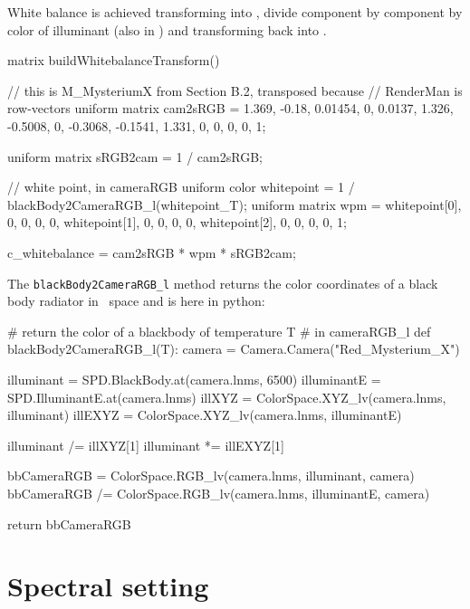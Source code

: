 White balance is achieved transforming into \camRGBl, divide component by
component by color of illuminant (also in \camRGBl) and transforming back into
\sRGBl.

\begin{rslcode}
matrix buildWhitebalanceTransform()
{
    // this is M\_MysteriumX from Section B.2, transposed because
    // RenderMan is row-vectors
    uniform matrix cam2sRGB = {  1.369,  -0.18,   0.01454, 0,
                                 0.0137,  1.326, -0.5008,  0,
                                -0.3068, -0.1541, 1.331,   0,
                                 0,       0,      0,       1};

    uniform matrix sRGB2cam = 1 / cam2sRGB;

    // white point, in cameraRGB
    uniform color whitepoint = 1 / blackBody2CameraRGB_l(whitepoint_T);
    uniform matrix wpm = {  whitepoint[0], 0,  0,  0,
                            0,  whitepoint[1], 0,  0,
                            0,  0,  whitepoint[2], 0,
                            0,  0,  0,             1};

    c_whitebalance = cam2sRGB * wpm * sRGB2cam;
}
\end{rslcode}

The \Verb|blackBody2CameraRGB_l| method returns the color coordinates of a black body
radiator in \camRGBl\ space and is here in python:

\begin{pythoncode}
# return the color of a blackbody of temperature T
# in cameraRGB\_l
def blackBody2CameraRGB_l(T):
    camera = Camera.Camera("Red_Mysterium_X")

    illuminant = SPD.BlackBody.at(camera.lnms, 6500)
    illuminantE = SPD.IlluminantE.at(camera.lnms)
    illXYZ = ColorSpace.XYZ_lv(camera.lnms, illuminant)
    illEXYZ = ColorSpace.XYZ_lv(camera.lnms, illuminantE)

    illuminant /= illXYZ[1]
    illuminant *= illEXYZ[1]

    bbCameraRGB = ColorSpace.RGB_lv(camera.lnms, illuminant, camera)
    bbCameraRGB /=  ColorSpace.RGB_lv(camera.lnms, illuminantE, camera)

    return bbCameraRGB
\end{pythoncode}



\section{Spectral setting}

